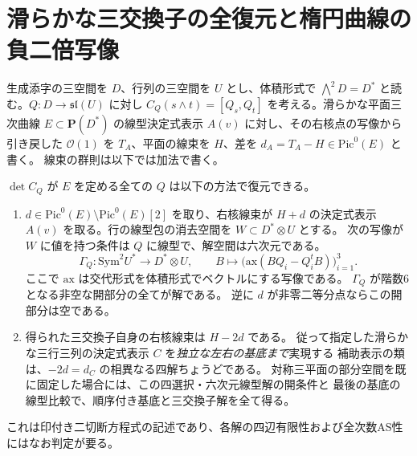 \section{滑らかな三交換子の全復元と楕円曲線の負二倍写像}
\label{sec:marked-elliptic-commutator-doubling}
生成添字の三空間を $D$、行列の三空間を $U$ とし、体積形式で
$\bigwedge^2D=D^*$ と読む。$Q:D\to\mathfrak{sl}(U)$ に対し
$C_Q(s\wedge t)=[Q_s,Q_t]$ を考える。滑らかな平面三次曲線 $E\subset\mathbf P(D^*)$
の線型決定式表示 $A(v)$ に対し、その右核点の写像から引き戻した
$\mathcal O(1)$ を $T_A$、平面の線束を $H$、差を $d_A=T_A-H\in\mathrm{Pic}^0(E)$ と書く。
線束の群則は以下では加法で書く。
\begin{theorem}\label{thm:marked-elliptic-commutator-doubling}
$\det C_Q$ が $E$ を定める全ての $Q$ は以下の方法で復元できる。
\begin{enumerate}
\item $d\in\mathrm{Pic}^0(E)\setminus\mathrm{Pic}^0(E)[2]$ を取り、右核線束が
$H+d$ の決定式表示 $A(v)$ を取る。行の線型包の消去空間を $W\subset D^*\otimes U$ とする。
次の写像が $W$ に値を持つ条件は $Q$ に線型で、解空間は六次元である。
\[
 \Gamma_Q:\mathrm{Sym}^2 U^*\longrightarrow D^*\otimes U,\qquad
          B\longmapsto\big(\mathrm{ax}(BQ_i-Q_i^t B)\big)_{i=1}^3 .
\]
ここで $\mathrm{ax}$ は交代形式を体積形式でベクトルにする写像である。
$\Gamma_Q$ が階数6となる非空な開部分の全てが解である。
逆に $d$ が非零二等分点ならこの開部分は空である。
\item 得られた三交換子自身の右核線束は $H-2d$ である。
従って指定した滑らかな三行三列の決定式表示 $C$ を\emph{独立な左右の基底まで}実現する
補助表示の類は、$-2d=d_C$ の相異なる四解ちょうどである。
対称三平面の部分空間を既に固定した場合には、この四選択・六次元線型解の開条件と
最後の基底の線型比較で、順序付き基底と三交換子解を全て得る。
\end{enumerate}
これは印付き二切断方程式の記述であり、各解の四辺有限性および全次数AS性にはなお判定が要る。
\end{theorem}
